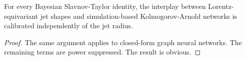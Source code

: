 \begin{proposition}\label{thm:1}
For every Bayesian Slavnov-Taylor identity, the interplay between
Lorentz-equivariant jet shapes and simulation-based Kolmogorov-Arnold
networks is calibrated independently of the jet radius.
\end{proposition}

\begin{proof}
The same argument applies to closed-form graph neural networks. The
remaining terms are power suppressed. The result is obvious.
\end{proof}

